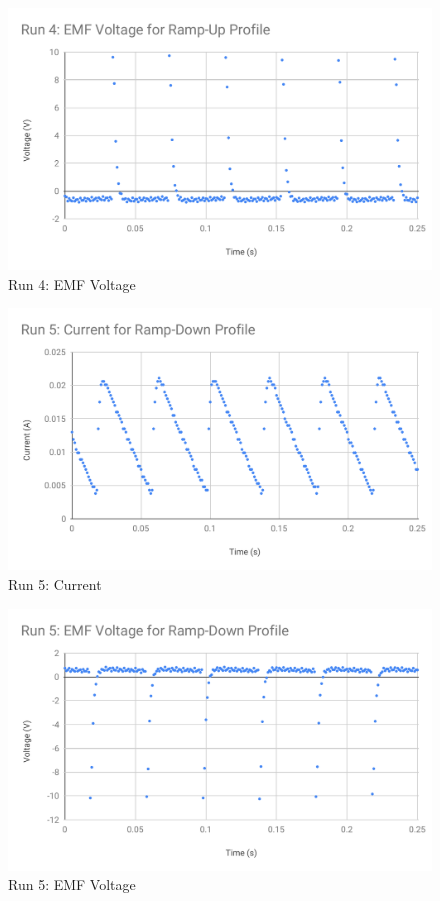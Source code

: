 %
\begin{figure}[ht]
	\centering
	\includegraphics[scale=0.74]{image/04-faraday/run-4-V.pdf}
	\caption{Run 4: EMF Voltage}
	\label{figure.04.run.4.V}
\end{figure}
%
\begin{figure}[ht]
	\centering
	\includegraphics[scale=0.74]{image/04-faraday/run-5-I.pdf}
	\caption{Run 5: Current}
	\label{figure.04.run.5.I}
\end{figure}
%
\begin{figure}[ht]
	\centering
	\includegraphics[scale=0.74]{image/04-faraday/run-5-V.pdf}
	\caption{Run 5: EMF Voltage}
	\label{figure.04.run.5.V}
\end{figure}
